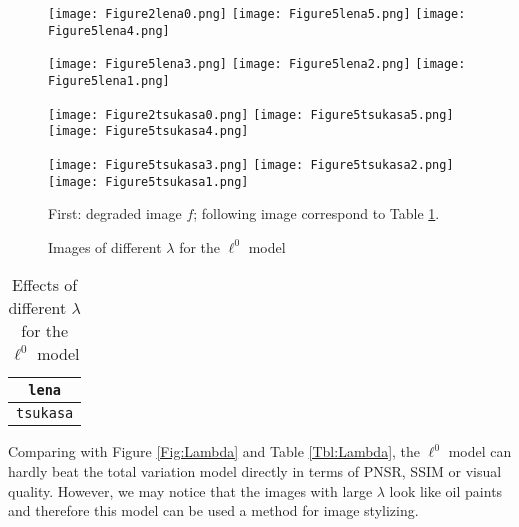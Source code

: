 \documentclass[english, nochinese]{pnote}
\begin{document}
\begin{figure}[htbp]
{
\centering

\texttt{[image: Figure2lena0.png]}
\texttt{[image: Figure5lena5.png]}
\texttt{[image: Figure5lena4.png]}

\texttt{[image: Figure5lena3.png]}
\texttt{[image: Figure5lena2.png]}
\texttt{[image: Figure5lena1.png]}

\texttt{[image: Figure2tsukasa0.png]}
\texttt{[image: Figure5tsukasa5.png]}
\texttt{[image: Figure5tsukasa4.png]}

\texttt{[image: Figure5tsukasa3.png]}
\texttt{[image: Figure5tsukasa2.png]}
\texttt{[image: Figure5tsukasa1.png]}

\caption{Images of different $\lambda$ for the $\ell^0$ model}
\label{Fig:L0}
}
{
\footnotesize First: degraded image $f$; following image correspond to Table \ref{Tbl:L0}.
}
\end{figure}

\begin{table}[htbp]
\centering
\begin{tabular}{|c|c|c|c|c|c|c|}
\hline
\multicolumn{7}{|c|}{\texttt{lena}} \\
\hline

\multicolumn{7}{|c|}{\texttt{tsukasa}} \\
\hline

\end{tabular}
\caption{Effects of different $\lambda$ for the $\ell^0$ model}
\label{Tbl:L0}
\end{table}

Comparing with Figure \ref{Fig:Lambda} and Table \ref{Tbl:Lambda}, the $\ell^0$ model can hardly beat the total variation model directly in terms of PNSR, SSIM or visual quality. However, we may notice that the images with large $\lambda$ look like oil paints and therefore this model can be used a method for image stylizing.

\printbibliography
\end{document}
